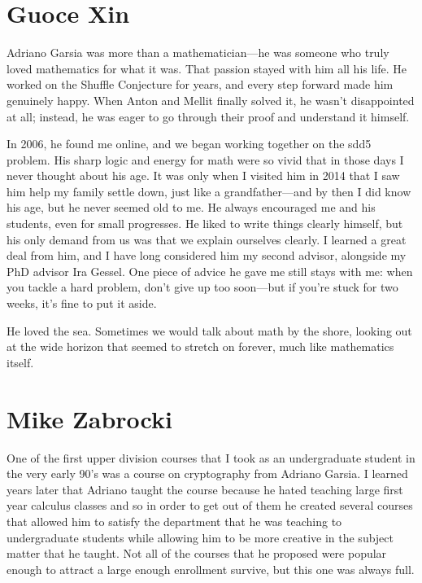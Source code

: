 \documentclass{amsart}
\begin{document}
\section*{Guoce Xin}

Adriano Garsia was more than a mathematician—he was someone who truly loved mathematics for what it was. That passion stayed with him all his life. He worked on the Shuffle Conjecture for years, and every step forward made him genuinely happy. When Anton and Mellit finally solved it, he wasn't disappointed at all; instead, he was eager to go through their proof and understand it himself.

In 2006, he found me online, and we began working together on the sdd5 problem. His sharp logic and energy for math were so vivid that in those days I never thought about his age. It was only when I visited him in 2014 that I saw him help my family settle down, just like a grandfather—and by then I did know his age, but he never seemed old to me. He always encouraged me and his students, even for small progresses. He liked to write things clearly himself, but his only demand from us was that we explain ourselves clearly. I learned a great deal from him, and I have long considered him my second advisor, alongside my PhD advisor Ira Gessel. One piece of advice he gave me still stays with me: when you tackle a hard problem, don't give up too soon—but if you're stuck for two weeks, it's fine to put it aside.

He loved the sea. Sometimes we would talk about math by the shore, looking out at the wide horizon that seemed to stretch on forever, much like mathematics itself.

\section*{Mike Zabrocki}

One of the first upper division courses that I took
as an undergraduate student in the very early 90's
was a course on cryptography from Adriano Garsia.
I learned years later that Adriano taught the course because
he hated teaching large first year calculus classes and so in order to get out
of them he created several courses that allowed him to satisfy the department that
he was teaching to undergraduate students while allowing him to be more creative in the
subject matter that he taught.  Not all of the courses that he proposed were popular enough
to attract a large enough enrollment survive, but this one was always full.
\end{document}
